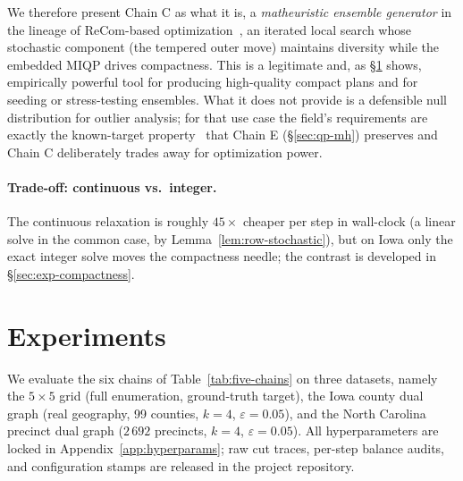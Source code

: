 \documentclass[11pt]{article}
\begin{document}
We therefore present Chain C as what it is, a \emph{matheuristic
ensemble generator} in the lineage of ReCom-based
optimization~\cite{cannon2023voting,brous2025recom}, an iterated
local search whose stochastic component (the tempered outer move)
maintains diversity while the embedded MIQP drives compactness. This
is a legitimate and, as \S\ref{sec:experiments} shows, empirically
powerful tool for producing high-quality compact plans and for
seeding or stress-testing ensembles. What it does not provide is a
defensible null distribution for outlier analysis; for that use case
the field's requirements are exactly the known-target
property~\cite{cannon2022spanning,mccartan2023sequential} that
Chain E (\S\ref{sec:qp-mh}) preserves and Chain C deliberately trades
away for optimization power.

\paragraph{Trade-off: continuous vs.\ integer.}\label{sec:iqp-pareto}
The continuous relaxation is roughly $45\times$ cheaper per step in
wall-clock (a linear solve in the common case, by
Lemma~\ref{lem:row-stochastic}), but on Iowa only the exact integer
solve moves the compactness needle; the contrast is developed in
\S\ref{sec:exp-compactness}.

\section{Experiments}\label{sec:experiments}

We evaluate the six chains of Table~\ref{tab:five-chains} on three
datasets, namely the $5 \times 5$ grid (full enumeration, ground-truth
target), the Iowa county dual graph (real geography, 99 counties,
$k = 4$, $\varepsilon = 0.05$), and the North Carolina precinct dual
graph ($2\,692$ precincts, $k = 4$, $\varepsilon = 0.05$). All hyperparameters are
locked in Appendix~\ref{app:hyperparams}; raw cut traces, per-step
balance audits, and configuration stamps are released in the project
repository.
\end{document}
